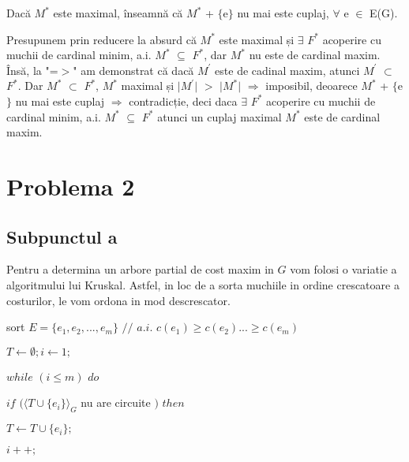 \documentclass{article}
\begin{document}
{{Dacă $M^*$ este maximal, înseamnă că $M^*$ + $\lbrace$e$\rbrace$ nu mai este cuplaj, $\forall$ e $\in$ E(G). 

Presupunem prin reducere la absurd că $M^*$ este maximal și $\exists$ $F^*$ acoperire cu muchii de cardinal minim, a.i.  $M^*$ $\subseteq$ $F^*$, dar $M^*$ nu este de cardinal maxim. Însă, la "=$>$" am demonstrat că dacă $M^{'}$ este de cadinal maxim, atunci $M^{'}$ $\subset$ $F^*$. Dar $M^*$ $\subset$ $F^*$, $M^*$ maximal și $\vert$$M^{'}$$\vert$ $>$ $\vert$$M^*$$\vert$ $\Rightarrow$ imposibil, deoarece $M^*$ + $\lbrace$e$\rbrace$ nu mai este cuplaj $\Rightarrow$ contradicție, deci daca $\exists$ $F^*$ acoperire cu muchii de cardinal minim, a.i.  $M^*$ $\subseteq$ $F^*$ atunci un cuplaj maximal $M^*$ este de cardinal maxim.

\section*{\fontsize{20}{50}\selectfont Problema 2}
\subsection*{\fontsize{16}{30}\selectfont Subpunctul a}
{\fontsize{14}{16}\selectfont 
    Pentru a determina un arbore partial de cost maxim in $G$ vom folosi o variatie a algoritmului lui Kruskal. Astfel, in loc de a sorta muchiile in ordine crescatoare a costurilor, le vom ordona in mod descrescator.
    \\ 
    \par sort $E=\lbrace e_1, e_2, ..., e_m \rbrace$ $//$ $a.i.$  $c(e_1)\geq c(e_2)...\geq c(e_m)$

    \par $T \leftarrow \emptyset; i \leftarrow 1;$
    \par $while$  $(i \leq m)$  $do$
    \par \hspace*{1cm} $if$ $(\langle T \cup \lbrace e_i \rbrace \rangle _G$ nu are circuite $)$  $then$
    \par \hspace*{1.5cm} $ T \leftarrow T \cup \lbrace e_i \rbrace ;$
    \par \hspace*{1cm} $i++;$
    }

}}
\end{document}
